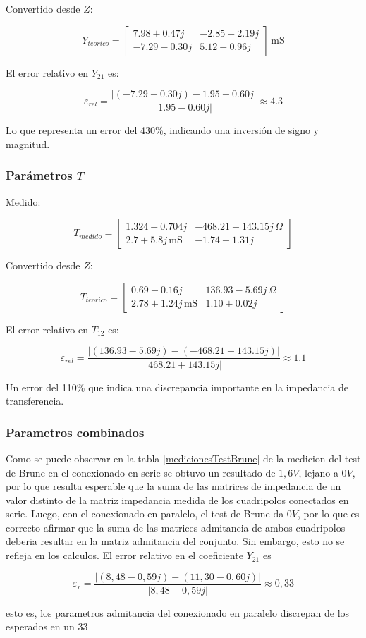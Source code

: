 Convertido desde $Z$:


\[
Y_{teorico} =
\begin{bmatrix}
7.98 + 0.47j & -2.85 + 2.19j \\
-7.29 - 0.30j & 5.12 - 0.96j
\end{bmatrix} \,\mathrm{mS}
\]



El error relativo en $Y_{21}$ es:



\[
\varepsilon_{rel} = \frac{|(-7.29 - 0.30j) - 1.95 + 0.60j|}{|1.95 - 0.60j|} \approx 4.3
\]



Lo que representa un error del 430\%, indicando una inversión de signo y magnitud.

\subsubsection*{Parámetros $T$}

Medido:


\[
T_{medido} =
\begin{bmatrix}
1.324 + 0.704j & -468.21 - 143.15j\,\Omega \\
2.7 + 5.8j\,\mathrm{mS} & -1.74 - 1.31j
\end{bmatrix}
\]



Convertido desde $Z$:


\[
T_{teorico} =
\begin{bmatrix}
0.69 - 0.16j & 136.93 - 5.69j\,\Omega \\
2.78 + 1.24j\,\mathrm{mS} & 1.10 + 0.02j
\end{bmatrix}
\]



El error relativo en $T_{12}$ es:



\[
\varepsilon_{rel} = \frac{|(136.93 - 5.69j) - (-468.21 - 143.15j)|}{|468.21 + 143.15j|} \approx 1.1
\]



Un error del 110\% que indica una discrepancia importante en la impedancia de transferencia.

\subsubsection{Parametros combinados}
Como se puede observar en la tabla \ref{medicionesTestBrune} de la medicion del test de Brune en el conexionado en serie se obtuvo un resultado de $1,6 V$, lejano a $0 V$, por lo que resulta esperable que la suma de las matrices de impedancia de un valor distinto de la matriz impedancia medida de los cuadripolos conectados en serie. Luego, con el conexionado en paralelo, el test de Brune da $0 V$, por lo que es correcto afirmar que la suma de las matrices admitancia de ambos cuadripolos deberia resultar en la matriz admitancia del conjunto. Sin embargo, esto no se refleja en los calculos. El error relativo en el coeficiente $Y_{21}$ es

\begin{equation*}
    \varepsilon_r = \frac{\left| (8,48 - 0,59j) - (11,30 - 0,60j) \right|} {\left| 8,48 - 0,59j \right|} \approx 0,33
\end{equation*}

esto es, los parametros admitancia del conexionado en paralelo discrepan de los esperados en un 33%
